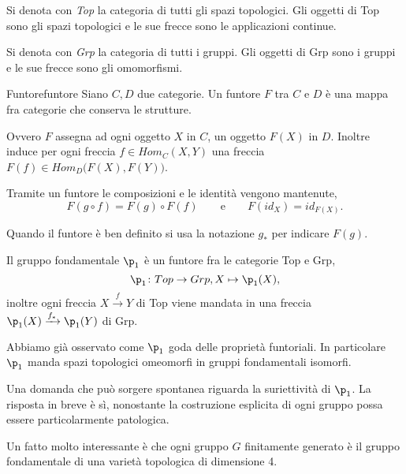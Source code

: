 \begin{ese}
	Si denota con \emph{Top} la categoria di tutti gli spazi topologici.
	Gli oggetti di Top sono gli spazi topologici e le sue frecce sono le applicazioni continue.
\end{ese}

\begin{ese}
	Si denota con \emph{Grp} la categoria di tutti i gruppi.
	Gli oggetti di Grp sono i gruppi e le sue frecce sono gli omomorfismi.
\end{ese}

\begin{defn}{Funtore}{funtore}
	Siano \(C,D\) due categorie.
	Un funtore \(F\) tra \(C\) e \(D\) è una mappa fra categorie che conserva le strutture.

	Ovvero \(F\) assegna ad ogni oggetto \(X\) in \(C\), un oggetto \(F(X)\) in \(D\).
	Inoltre induce per ogni freccia \(f\in Hom_C(X,Y)\) una freccia \(F(f)\in Hom_D\big(F(X),F(Y)\big)\).
\end{defn}

\begin{oss}
	Tramite un funtore le composizioni e le identità vengono mantenute,
	\[
		F(g\circ f) = F(g) \circ F(f) \qquad\text{e}\qquad F(id_X) = id_{F(X)}.
	\]
\end{oss}

\begin{notz}
	Quando il funtore è ben definito si usa la notazione \(g_*\) per indicare \(F(g)\).
\end{notz}

\begin{ese}
	Il gruppo fondamentale \(\p_1\) è un funtore fra le categorie Top e Grp,
	\[
		\p_1 \colon Top \to Grp, X \mapsto \p_1(X),
	\]
	inoltre ogni freccia \(X \xrightarrow{f} Y\) di Top viene mandata in una freccia \(\p_1(X) \xrightarrow{f_*} \p_1(Y)\) di Grp.
\end{ese}

\begin{oss}
	Abbiamo già osservato come \(\p_1\) goda delle proprietà funtoriali.
	In particolare \(\p_1\) manda spazi topologici omeomorfi in gruppi fondamentali isomorfi.
\end{oss}

Una domanda che può sorgere spontanea riguarda la suriettività di \(\p_1\).
La risposta in breve è sì, nonostante la costruzione esplicita di ogni gruppo possa essere particolarmente patologica.

Un fatto molto interessante è che ogni gruppo \(G\) finitamente generato è il gruppo fondamentale di una varietà topologica di dimensione 4.
%
%
